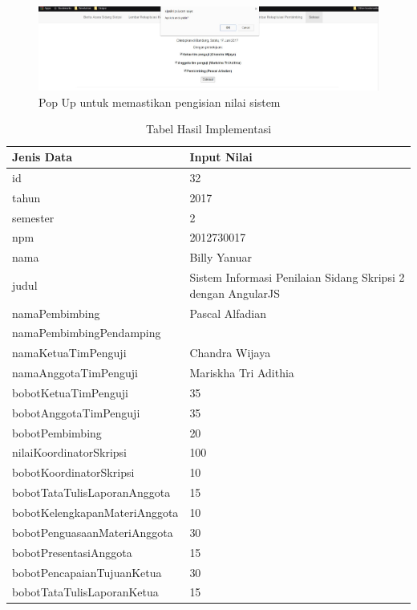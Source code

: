 \begin{enumerate}
\begin{figure}[H]
		\includegraphics[scale=0.4]{Gambar/selesaiisi2}
		\caption{Pop Up untuk memastikan pengisian nilai sistem}
		\label{tab: hasilPeng2}
	\end{figure}
		\begin{table}[htbp]
			\centering
			\caption{Tabel Hasil Implementasi}
			\begin{tabular}{| m{7cm} | m{5cm} |}
				\hline
				Jenis Data & Input Nilai\\
				\hline
				id & 32\\
				\hline
				tahun & 2017\\
				\hline
				semester & 2\\
				\hline
				npm & 2012730017\\
				\hline
				nama & Billy Yanuar\\
				\hline
				judul & Sistem Informasi Penilaian Sidang Skripsi 2 dengan AngularJS\\
				\hline
				namaPembimbing & Pascal Alfadian\\
				\hline
				namaPembimbingPendamping & \\
				\hline
				namaKetuaTimPenguji & Chandra Wijaya\\
				\hline
				namaAnggotaTimPenguji & Mariskha Tri Adithia\\
				\hline
				bobotKetuaTimPenguji & 35\\
				\hline
				bobotAnggotaTimPenguji & 35\\
				\hline
				bobotPembimbing & 20\\
				\hline
				nilaiKoordinatorSkripsi & 100\\
				\hline
				bobotKoordinatorSkripsi & 10\\
				\hline
				bobotTataTulisLaporanAnggota & 15\\
				\hline
				bobotKelengkapanMateriAnggota & 10\\
				\hline
				bobotPenguasaanMateriAnggota & 30\\
				\hline
				bobotPresentasiAnggota & 15\\
				\hline
				bobotPencapaianTujuanKetua & 30\\
				\hline
				bobotTataTulisLaporanKetua & 15\\

\end{tabular}
\end{table}
\end{enumerate}
